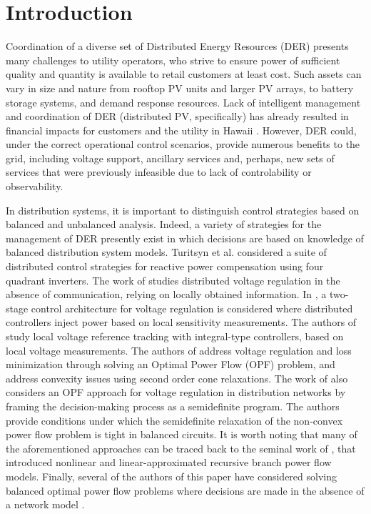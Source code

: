 \section{Introduction}
\label{sec:introduction}

Coordination of a diverse set of Distributed Energy Resources (DER) presents many challenges to utility operators, who strive to ensure power of sufficient quality and quantity is available to retail customers at least cost.  Such assets can vary in size and nature from rooftop PV units and larger PV arrays, to battery storage systems, and demand response resources.  Lack of intelligent management and coordination of DER (distributed PV, specifically) has already resulted in financial impacts for customers and the utility in Hawaii \cite{stewart2013analysis}.  However, DER could, under the correct operational control scenarios, provide numerous benefits to the grid, including voltage support, ancillary services \cite{doe2015ADMS} and, perhaps, new sets of services that were previously infeasible due to lack of controlability or observability.

In distribution systems, it is important to distinguish control strategies based on balanced and unbalanced analysis.  Indeed, a variety of strategies for the management of DER presently exist in which decisions are based on knowledge of balanced distribution system models.  Turitsyn et al. \cite{turitsyn2011options} considered a suite of distributed control strategies for reactive power compensation using four quadrant inverters.  The work of \cite{li2014real} studies distributed voltage regulation in the absence of communication, relying on locally obtained information.  In \cite{robbins2013two}, a two-stage control architecture for voltage regulation is considered where distributed controllers inject power based on local sensitivity measurements.  The authors of \cite{zhang2013local} study local voltage reference tracking with integral-type controllers, based on local voltage measurements.  The authors of \cite{farivar2011inverter} address voltage regulation and loss minimization through solving an Optimal Power Flow (OPF) problem, and address convexity issues using second order cone relaxations.  The work of \cite{lam2012optimal} also considers an OPF approach for voltage regulation in distribution networks by framing the decision-making process as a semidefinite program.  The authors provide conditions under which the semidefinite relaxation of the non-convex power flow problem is tight in balanced circuits. It is worth noting that many of the aforementioned approaches can be traced back to the seminal work of \cite{baran1989optimal}, that introduced nonlinear and linear-approximated recursive branch power flow models.  Finally, several of the authors of this paper have considered solving balanced optimal power flow problems where decisions are made in the absence of a network model \cite{arnold2015model}.

